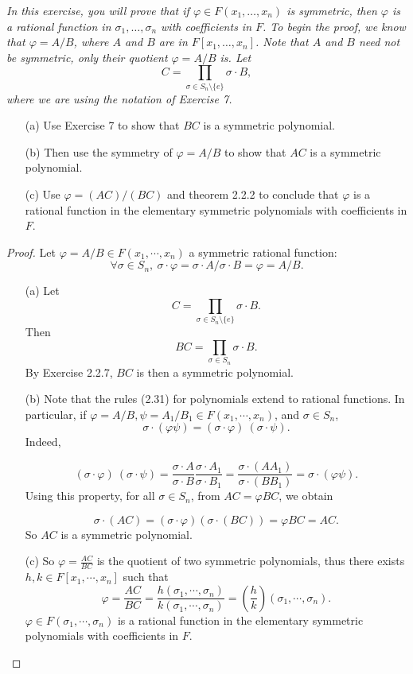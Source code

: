 \documentclass[11pt,a4paper]{article}
\begin{document}
{\it In this exercise, you will prove that if $\varphi \in F(x_1,\ldots,x_n)$ is symmetric, then $\varphi$ is a rational function in $\sigma_1,\ldots,\sigma_n$ with coefficients in $F$. To begin the proof, we know that $\varphi = A/B$, where $A$ and $B$ are in $F[x_1,\ldots,x_n]$. Note that $A$ and $B$ need not be symmetric, only their quotient $\varphi = A/B$ is. Let
$$C = \prod_{\sigma \in S_n \setminus \{e\} } \sigma \cdot B,$$
where we are using the notation of Exercise 7.
\begin{enumerate}
\item[(a)] Use Exercise 7 to show that $BC$ is a symmetric polynomial.
\item[(b)] Then use the symmetry of $\varphi = A/B$ to show that $AC$ is a symmetric polynomial.
\item[(c)] Use $\varphi = (AC)/(BC)$ and theorem 2.2.2 to conclude that $\varphi$ is a rational function in the elementary symmetric polynomials with coefficients in $F$.
\end{enumerate}
}

\begin{proof}
Let $\varphi = A/B\in F(x_1,\cdots,x_n)$ a symmetric rational function:
$$\forall \sigma \in S_n,\  \sigma \cdot \varphi = \sigma \cdot A/\sigma \cdot B = \varphi = A/B.$$
\begin{enumerate}
\item[(a)]
Let $$C =  \prod_{\sigma \in S_n\setminus \{e\}} \sigma \cdot B.$$
Then $$ BC = \prod_{\sigma \in S_n}\sigma \cdot B.$$
By Exercise 2.2.7, $BC$ is then a symmetric polynomial.


\item[(b)]
Note that the rules (2.31) for polynomials extend to rational functions. In particular, if $\varphi = A/B,\psi =A_1/B_1 \in F(x_1,\cdots,x_n)$, and $\sigma \in S_n$, 
$$\sigma \cdot (\varphi \psi) = (\sigma \cdot \varphi)\  (\sigma \cdot \psi).$$
Indeed, 

$$ (\sigma \cdot \varphi)\  (\sigma \cdot \psi) = \frac{\sigma \cdot A}{\sigma \cdot B} \frac{\sigma \cdot A_1}{\sigma \cdot B_1}=\frac{\sigma \cdot (AA_1)}{\sigma \cdot (BB_1)} = \sigma \cdot (\varphi \psi). $$
Using this property, for all $\sigma \in S_n$, from $AC = \varphi BC$, we obtain

$$\sigma \cdot (AC) = (\sigma \cdot  \varphi)(\sigma \cdot (BC)) = \varphi BC = AC.$$
So  $AC$ is a symmetric polynomial.


\item[(c)]
So $\varphi = \frac{AC}{BC}$ is  the quotient of two symmetric polynomials, thus there exists $h,k \in F[x_1,\cdots,x_n]$ such that
$$\varphi = \frac{AC}{BC} = \frac{h(\sigma_1,\cdots,\sigma_n)}{k(\sigma_1,\cdots,\sigma_n)} =\left( \frac{h}{k}\right)(\sigma_1,\cdots,\sigma_n).$$
$\varphi \in F(\sigma_1,\cdots,\sigma_n)$ is a rational function in the elementary symmetric polynomials with coefficients in $F$.
\end{enumerate}
\end{proof}
\end{document}
